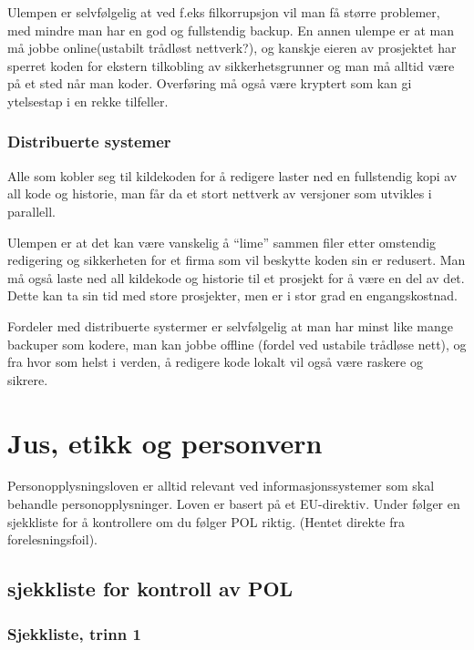 \documentclass[11pt]{article}
\begin{document}
    Ulempen er selvfølgelig at ved f.eks filkorrupsjon vil man få større problemer, med mindre 
    man har en god og fullstendig backup. En annen ulempe er at man må jobbe online(ustabilt 
    trådløst nettverk?), og kanskje eieren av prosjektet har sperret koden for ekstern 
    tilkobling av sikkerhetsgrunner og man må alltid være på et sted når man koder. Overføring
    må også være kryptert som kan gi ytelsestap i en rekke tilfeller.
    
\subsubsection{Distribuerte systemer}
\label{sec-17.2.2}

    Alle som kobler seg til kildekoden for å redigere laster ned en fullstendig kopi
    av all kode og historie, man får da et stort nettverk av versjoner som utvikles i
    parallell.

    Ulempen er at det kan være vanskelig å ``lime'' sammen filer etter omstendig redigering
    og sikkerheten for et firma som vil beskytte koden sin er redusert. Man må også laste
    ned all kildekode og historie til et prosjekt for å være en del av det. Dette kan ta sin
    tid med store prosjekter, men er i stor grad en engangskostnad.

    Fordeler med distribuerte systermer er selvfølgelig at man har minst like mange backuper
    som kodere, man kan jobbe offline (fordel ved ustabile trådløse nett), og fra hvor som helst
    i verden, å redigere kode lokalt vil også være raskere og sikrere.
\section{Jus, etikk og personvern}
\label{sec-18}

  Personopplysningsloven er alltid relevant ved informasjonssystemer som skal behandle personopplysninger. Loven er basert på et EU-direktiv. Under følger en sjekkliste for å kontrollere om du følger POL riktig. (Hentet direkte fra forelesningsfoil).
\subsection{sjekkliste for kontroll av POL}
\label{sec-18.1}
\subsubsection{Sjekkliste, trinn 1}
\label{sec-18.1.1}
\end{document}
